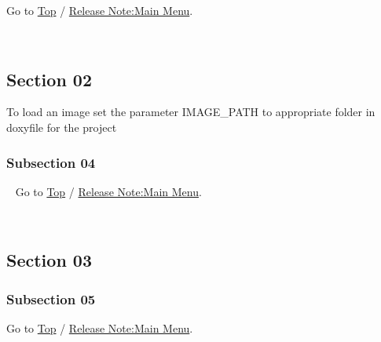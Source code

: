 Go to \hyperlink{software_design}{Top} / \hyperlink{product_release_main_page}{Release Note\+:Main Menu}.

~\newline
~\newline
\hypertarget{software_design_sw_section_02}{}\subsection{Section 02}\label{software_design_sw_section_02}
To load an image set the parameter I\+M\+A\+G\+E\+\_\+\+P\+A\+T\+H to appropriate folder in doxyfile for the project\hypertarget{software_design_sw_subsection_04}{}\subsubsection{Subsection 04}\label{software_design_sw_subsection_04}
~\newline
Go to \hyperlink{software_design}{Top} / \hyperlink{product_release_main_page}{Release Note\+:Main Menu}.

~\newline
 ~\newline
\hypertarget{software_design_sw_section_03}{}\subsection{Section 03}\label{software_design_sw_section_03}
\hypertarget{software_design_sw_subsection_05}{}\subsubsection{Subsection 05}\label{software_design_sw_subsection_05}
Go to \hyperlink{software_design}{Top} / \hyperlink{product_release_main_page}{Release Note\+:Main Menu}. 